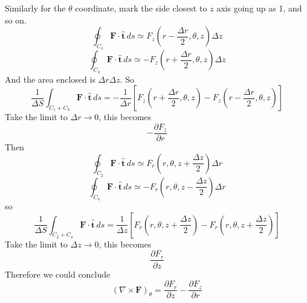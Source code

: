 \documentclass{article}
\begin{document}
\begin{homeworkProblem}
	Similarly for the $\theta$ coordinate, mark the side closest to $z$ axis going up as 1, and so on.
	\[
		\oint_{C_1}\mathbf{F}\cdot\hat{\mathbf{t}}\,ds\simeq F_z\left(r-\frac{\Delta r}{2},\theta,z\right)\Delta z
	\]
	\[
		\oint_{C_3}\mathbf{F}\cdot\hat{\mathbf{t}}\,ds\simeq-F_z\left(r+\frac{\Delta r}{2},\theta,z\right)\Delta z
	\]
	And the area enclosed is $\Delta r\Delta z$. So
	\[
		\frac{1}{\Delta S}\int_{C_1+C_3}\mathbf{F}\cdot\hat{\mathbf{t}}\,ds=-\frac{1}{\Delta r}\left[F_z\left(r+\frac{\Delta r}{2},\theta,z\right)-F_z\left(r-\frac{\Delta r}{2},\theta,z\right)\right]
	\]
	Take the limit to $\Delta r\rightarrow0$, this becomes
	\[
		-\frac{\partial F_z}{\partial r}
	\]
	Then
	\[
		\oint_{C_2}\mathbf{F}\cdot\hat{\mathbf{t}}\,ds\simeq F_r\left(r,\theta,z+\frac{\Delta z}{2}\right)\Delta r
	\]
	\[
		\oint_{C_4}\mathbf{F}\cdot\hat{\mathbf{t}}\,ds\simeq-F_r\left(r,\theta,z-\frac{\Delta z}{2}\right)\Delta r
	\]
	so
	\[
		\frac{1}{\Delta S}\int_{C_2+C_4}\mathbf{F}\cdot\hat{\mathbf{t}}\,ds=\frac{1}{\Delta z}\left[F_r\left(r,\theta,z+\frac{\Delta z}{2}\right)-F_r\left(r,\theta,z+\frac{\Delta z}{2}\right)\right]
	\]
	Take the limit to $\Delta z\rightarrow0$, this becomes
	\[
		\frac{\partial F_r}{\partial z}
	\]
	Therefore we could conclude
	\[
		(\nabla\times\mathbf{F})_\theta=\frac{\partial F_r}{\partial z}-\frac{\partial F_z}{\partial r}
	\]
\end{homeworkProblem}

\end{document}
